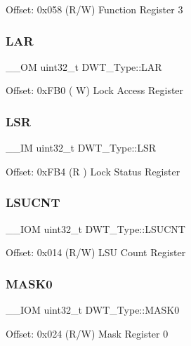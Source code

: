 Offset\+: 0x058 (R/W) Function Register 3 \mbox{\label{structDWT__Type_a4b8037802a3b25e367f0977d86f754ad}} 
\subsubsection{\texorpdfstring{LAR}{LAR}}
{\footnotesize\ttfamily \+\_\+\+\_\+\+OM uint32\+\_\+t D\+W\+T\+\_\+\+Type\+::\+L\+AR}

Offset\+: 0x\+F\+B0 ( W) Lock Access Register \mbox{\label{structDWT__Type_a4281befcc19ee69afdd50801cb1c9bcf}} 
\subsubsection{\texorpdfstring{LSR}{LSR}}
{\footnotesize\ttfamily \+\_\+\+\_\+\+IM uint32\+\_\+t D\+W\+T\+\_\+\+Type\+::\+L\+SR}

Offset\+: 0x\+F\+B4 (R ) Lock Status Register \mbox{\label{structDWT__Type_acc05d89bdb1b4fe2fa499920ec02d0b1}} 
\subsubsection{\texorpdfstring{LSUCNT}{LSUCNT}}
{\footnotesize\ttfamily \+\_\+\+\_\+\+I\+OM uint32\+\_\+t D\+W\+T\+\_\+\+Type\+::\+L\+S\+U\+C\+NT}

Offset\+: 0x014 (R/W) L\+SU Count Register \mbox{\label{structDWT__Type_a821eb5e71f340ec077efc064cfc567db}} 
\subsubsection{\texorpdfstring{MASK0}{MASK0}}
{\footnotesize\ttfamily \+\_\+\+\_\+\+I\+OM uint32\+\_\+t D\+W\+T\+\_\+\+Type\+::\+M\+A\+S\+K0}

Offset\+: 0x024 (R/W) Mask Register 0 \mbox{\label{structDWT__Type_aabf94936c9340e62fed836dcfb152405}} 
